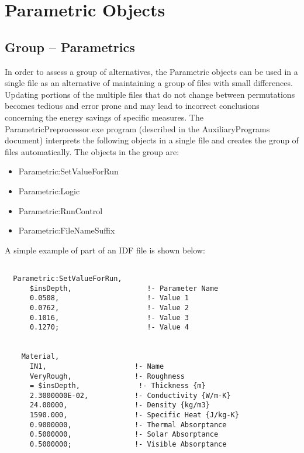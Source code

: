 \chapter{Parametric Objects}\label{parametric-objects}

\section{Group -- Parametrics}\label{group-parametrics}

In order to assess a group of alternatives, the Parametric objects can be used in a single file as an alternative of maintaining a group of files with small differences. Updating portions of the multiple files that do not change between permutations becomes tedious and error prone and may lead to incorrect conclusions concerning the energy savings of specific measures. The ParametricPreprocessor.exe program (described in the AuxiliaryPrograms document) interprets the following objects in a single file and creates the group of files automatically. The objects in the group are:

\begin{itemize}
\item
  Parametric:SetValueForRun
\item
  Parametric:Logic
\item
  Parametric:RunControl
\item
  Parametric:FileNameSuffix
\end{itemize}

A simple example of part of an IDF file is shown below:

\begin{lstlisting}

  Parametric:SetValueForRun,
      $insDepth,                  !- Parameter Name
      0.0508,                     !- Value 1
      0.0762,                     !- Value 2
      0.1016,                     !- Value 3
      0.1270;                     !- Value 4


    Material,
      IN1,                     !- Name
      VeryRough,               !- Roughness
      = $insDepth,              !- Thickness {m}
      2.3000000E-02,           !- Conductivity {W/m-K}
      24.00000,                !- Density {kg/m3}
      1590.000,                !- Specific Heat {J/kg-K}
      0.9000000,               !- Thermal Absorptance
      0.5000000,               !- Solar Absorptance
      0.5000000;               !- Visible Absorptance
\end{lstlisting}

